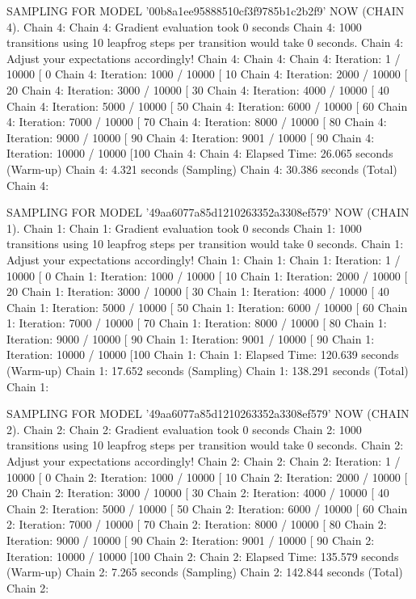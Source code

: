 \documentclass[
]{jss}
\begin{document}
\begin{CodeChunk}
\begin{CodeOutput}
SAMPLING FOR MODEL '00b8a1ee95888510cf3f9785b1c2b2f9' NOW (CHAIN 4).
Chain 4: 
Chain 4: Gradient evaluation took 0 seconds
Chain 4: 1000 transitions using 10 leapfrog steps per transition would take 0 seconds.
Chain 4: Adjust your expectations accordingly!
Chain 4: 
Chain 4: 
Chain 4: Iteration:    1 / 10000 [  0%
Chain 4: Iteration: 1000 / 10000 [ 10%
Chain 4: Iteration: 2000 / 10000 [ 20%
Chain 4: Iteration: 3000 / 10000 [ 30%
Chain 4: Iteration: 4000 / 10000 [ 40%
Chain 4: Iteration: 5000 / 10000 [ 50%
Chain 4: Iteration: 6000 / 10000 [ 60%
Chain 4: Iteration: 7000 / 10000 [ 70%
Chain 4: Iteration: 8000 / 10000 [ 80%
Chain 4: Iteration: 9000 / 10000 [ 90%
Chain 4: Iteration: 9001 / 10000 [ 90%
Chain 4: Iteration: 10000 / 10000 [100%
Chain 4: 
Chain 4:  Elapsed Time: 26.065 seconds (Warm-up)
Chain 4:                4.321 seconds (Sampling)
Chain 4:                30.386 seconds (Total)
Chain 4: 

SAMPLING FOR MODEL '49aa6077a85d1210263352a3308ef579' NOW (CHAIN 1).
Chain 1: 
Chain 1: Gradient evaluation took 0 seconds
Chain 1: 1000 transitions using 10 leapfrog steps per transition would take 0 seconds.
Chain 1: Adjust your expectations accordingly!
Chain 1: 
Chain 1: 
Chain 1: Iteration:    1 / 10000 [  0%
Chain 1: Iteration: 1000 / 10000 [ 10%
Chain 1: Iteration: 2000 / 10000 [ 20%
Chain 1: Iteration: 3000 / 10000 [ 30%
Chain 1: Iteration: 4000 / 10000 [ 40%
Chain 1: Iteration: 5000 / 10000 [ 50%
Chain 1: Iteration: 6000 / 10000 [ 60%
Chain 1: Iteration: 7000 / 10000 [ 70%
Chain 1: Iteration: 8000 / 10000 [ 80%
Chain 1: Iteration: 9000 / 10000 [ 90%
Chain 1: Iteration: 9001 / 10000 [ 90%
Chain 1: Iteration: 10000 / 10000 [100%
Chain 1: 
Chain 1:  Elapsed Time: 120.639 seconds (Warm-up)
Chain 1:                17.652 seconds (Sampling)
Chain 1:                138.291 seconds (Total)
Chain 1: 

SAMPLING FOR MODEL '49aa6077a85d1210263352a3308ef579' NOW (CHAIN 2).
Chain 2: 
Chain 2: Gradient evaluation took 0 seconds
Chain 2: 1000 transitions using 10 leapfrog steps per transition would take 0 seconds.
Chain 2: Adjust your expectations accordingly!
Chain 2: 
Chain 2: 
Chain 2: Iteration:    1 / 10000 [  0%
Chain 2: Iteration: 1000 / 10000 [ 10%
Chain 2: Iteration: 2000 / 10000 [ 20%
Chain 2: Iteration: 3000 / 10000 [ 30%
Chain 2: Iteration: 4000 / 10000 [ 40%
Chain 2: Iteration: 5000 / 10000 [ 50%
Chain 2: Iteration: 6000 / 10000 [ 60%
Chain 2: Iteration: 7000 / 10000 [ 70%
Chain 2: Iteration: 8000 / 10000 [ 80%
Chain 2: Iteration: 9000 / 10000 [ 90%
Chain 2: Iteration: 9001 / 10000 [ 90%
Chain 2: Iteration: 10000 / 10000 [100%
Chain 2: 
Chain 2:  Elapsed Time: 135.579 seconds (Warm-up)
Chain 2:                7.265 seconds (Sampling)
Chain 2:                142.844 seconds (Total)
Chain 2: 


\end{CodeOutput}
\end{CodeChunk}
\end{document}
